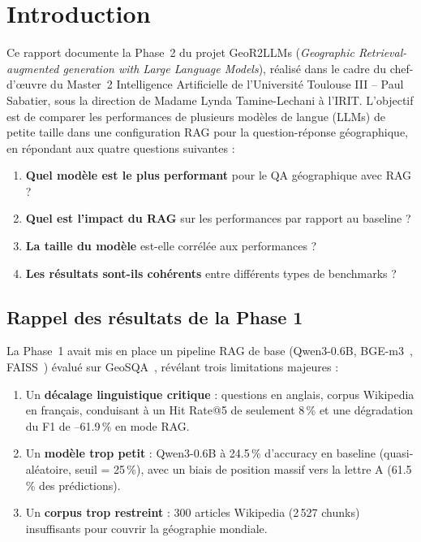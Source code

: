 \documentclass[12pt,a4paper]{article}
\begin{document}
\newpage
\tableofcontents
\newpage

\section{Introduction}
\label{sec:introduction}

Ce rapport documente la Phase~2 du projet GeoR2LLMs (\textit{Geographic Retrieval-augmented
generation with Large Language Models}), r\'ealis\'e dans le cadre du chef-d'\oe uvre du Master~2
Intelligence Artificielle de l'Universit\'e Toulouse III -- Paul Sabatier, sous la direction de
Madame Lynda Tamine-Lechani \`a l'IRIT. L'objectif est de comparer les performances de plusieurs
mod\`eles de langue (LLMs) de petite taille dans une configuration RAG pour la question-r\'eponse
g\'eographique, en r\'epondant aux quatre questions suivantes :

\begin{enumerate}[leftmargin=*]
  \item \textbf{Quel mod\`ele est le plus performant} pour le QA g\'eographique avec RAG ?
  \item \textbf{Quel est l'impact du RAG} sur les performances par rapport au baseline ?
  \item \textbf{La taille du mod\`ele} est-elle corr\'el\'ee aux performances ?
  \item \textbf{Les r\'esultats sont-ils coh\'erents} entre diff\'erents types de benchmarks ?
\end{enumerate}

\subsection{Rappel des r\'esultats de la Phase 1}

La Phase~1 avait mis en place un pipeline RAG de base (Qwen3-0.6B, BGE-m3~\cite{chen2024bgem3},
FAISS~\cite{johnson2019faiss}) \'evalu\'e sur GeoSQA~\cite{huang_geosqa_2019}, r\'ev\'elant
trois limitations majeures :
\begin{enumerate}[leftmargin=*]
  \item Un \textbf{d\'ecalage linguistique critique} : questions en anglais, corpus Wikipedia
  en fran\c{c}ais, conduisant \`a un Hit Rate@5 de seulement 8\,\% et une d\'egradation du F1
  de --61.9\,\% en mode RAG.
  \item Un \textbf{mod\`ele trop petit} : Qwen3-0.6B \`a 24.5\,\% d'accuracy en baseline
  (quasi-al\'eatoire, seuil = 25\,\%), avec un biais de position massif vers la lettre A
  (61.5\,\% des pr\'edictions).
  \item Un \textbf{corpus trop restreint} : 300 articles Wikipedia (2\,527 chunks) insuffisants
  pour couvrir la g\'eographie mondiale.
\end{enumerate}
\end{document}
